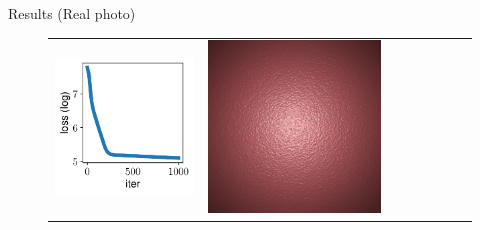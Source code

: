 \documentclass[final]{beamer}
\newlength{\twocolwid}
\newlength{\resultwidth}
\begin{document}
\begin{frame}[t]
\begin{columns}[t]
\begin{column}{\twocolwid}
\begin{block}{Results (Real photo)}
\begin{figure}[t]
\begin{tabular}{ccrclccc}
            		\includegraphics[width=\resultwidth]{real/bump/loss.pdf} &
            		\includegraphics[width=\resultwidth]{real/bump/optim.jpg} &

\end{tabular}
\end{figure}
\end{block}
\end{column}
\end{columns}
\end{frame}
\end{document}
